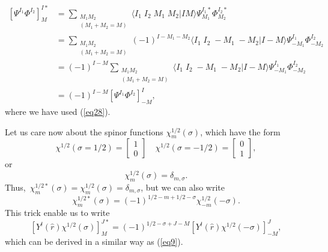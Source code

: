 \begin{subappendices}
\begin{equation}\label{eq9}
\begin{split}
\left[ \Psi^{I_1}\Phi^{I_2}\right]^{I*}_M&=\sum_{\substack{M_1M_2\\(M_1+M_2=M)}}
\langle I_1\; I_2 \; M_1\;M_2 | I M\rangle \Psi^{I_1*}_{M_1} \Phi^{I_2*}_{M_2} \\
&= \sum_{\substack{M_1M_2\\(M_1+M_2=M)}} (-1)^{I-M_1-M_2}
\langle I_1\; I_2 \; -M_1\;-M_2 | I -M\rangle \Psi^{I_1}_{-M_1}\Phi^{I_2}_{-M_2}\\
&= (-1)^{I-M} \sum_{\substack{M_1M_2\\(M_1+M_2=M)}}
\langle I_1\; I_2 \; -M_1\;-M_2 | I -M\rangle \Psi^{I_1}_{-M_1}\Phi^{I_2}_{-M_2}\\
&=(-1)^{I-M} \left[ \Psi^{I_1}\Phi^{I_2}\right]^{I}_{-M},
\end{split}
\end{equation}
where we have used (\ref{eq28}).

Let us care now about the spinor functions $\chi^{1/2}_m(\sigma)$, which have the form
\begin{equation}\label{eq10}
\chi^{1/2}(\sigma=1/2)=\left[ \begin{aligned} 1\\0 \end{aligned}\right]  \quad
\chi^{1/2}(\sigma=-1/2)=\left[ \begin{aligned} 0\\1 \end{aligned}\right],
\end{equation}
or
\begin{equation}\label{eq11}
\chi^{1/2}_m(\sigma)=\delta_{m,\sigma}.
\end{equation}
Thus, $\, \chi^{1/2*}_m(\sigma)=\chi^{1/2}_m(\sigma)=\delta_{m,\sigma}$, but we can also write
\begin{equation}\label{eq12}
\chi^{1/2*}_m(\sigma)=(-1)^{1/2-m+1/2-\sigma}\chi^{1/2}_{-m}(-\sigma).
\end{equation}
This trick enable us to write
\begin{equation}\label{eq13}
\left[ Y^{l}(\hat r)\chi^{1/2}(\sigma)\right]^{J*}_{M}=(-1)^{1/2-\sigma+J-M}
\left[ Y^{l}(\hat r)\chi^{1/2}(-\sigma)\right]^{J}_{-M},
\end{equation}
which can be derived in a similar way as (\ref{eq9}).


\end{subappendices}
